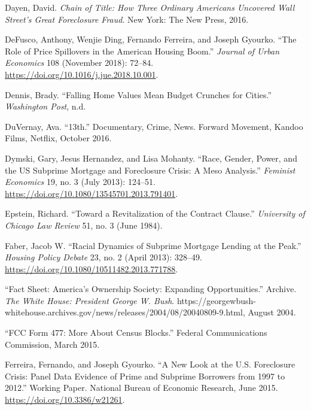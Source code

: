 \documentclass[12pt,oneside]{psthesis}
\begin{document}
\leavevmode\hypertarget{ref-dayenChainTitleHow2016}{}%
Dayen, David. \emph{Chain of Title: How Three Ordinary Americans Uncovered Wall Street's Great Foreclosure Fraud}. New York: The New Press, 2016.

\leavevmode\hypertarget{ref-defusco2018role}{}%
DeFusco, Anthony, Wenjie Ding, Fernando Ferreira, and Joseph Gyourko. ``The Role of Price Spillovers in the American Housing Boom.'' \emph{Journal of Urban Economics} 108 (November 2018): 72--84. \url{https://doi.org/10.1016/j.jue.2018.10.001}.

\leavevmode\hypertarget{ref-dennis2011falling}{}%
Dennis, Brady. ``Falling Home Values Mean Budget Crunches for Cities.'' \emph{Washington Post}, n.d.

\leavevmode\hypertarget{ref-duvernay201613th}{}%
DuVernay, Ava. ``13th.'' Documentary, Crime, News. Forward Movement, Kandoo Films, Netflix, October 2016.

\leavevmode\hypertarget{ref-dymski2013race}{}%
Dymski, Gary, Jesus Hernandez, and Lisa Mohanty. ``Race, Gender, Power, and the US Subprime Mortgage and Foreclosure Crisis: A Meso Analysis.'' \emph{Feminist Economics} 19, no. 3 (July 2013): 124--51. \url{https://doi.org/10.1080/13545701.2013.791401}.

\leavevmode\hypertarget{ref-epstein1984revitalization}{}%
Epstein, Richard. ``Toward a Revitalization of the Contract Clause.'' \emph{University of Chicago Law Review} 51, no. 3 (June 1984).

\leavevmode\hypertarget{ref-faber2013racial}{}%
Faber, Jacob W. ``Racial Dynamics of Subprime Mortgage Lending at the Peak.'' \emph{Housing Policy Debate} 23, no. 2 (April 2013): 328--49. \url{https://doi.org/10.1080/10511482.2013.771788}.

\leavevmode\hypertarget{ref-2004fact}{}%
``Fact Sheet: America's Ownership Society: Expanding Opportunities.'' Archive. \emph{The White House: President George W. Bush}. https://georgewbush-whitehouse.archives.gov/news/releases/2004/08/20040809-9.html, August 2004.

\leavevmode\hypertarget{ref-2015fcc}{}%
``FCC Form 477: More About Census Blocks.'' Federal Communications Commission, March 2015.

\leavevmode\hypertarget{ref-ferreira2015new}{}%
Ferreira, Fernando, and Joseph Gyourko. ``A New Look at the U.S. Foreclosure Crisis: Panel Data Evidence of Prime and Subprime Borrowers from 1997 to 2012.'' Working Paper. National Bureau of Economic Research, June 2015. \url{https://doi.org/10.3386/w21261}.
\end{document}

